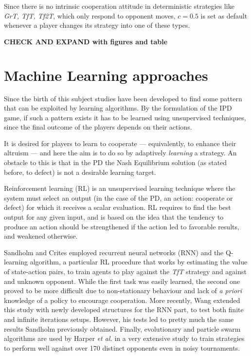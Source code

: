 \documentclass[journal,a4paper,10pt,twoside]{IEEEtran} %
\begin{document}
Since there is no intrinsic cooperation attitude in deterministic strategies like \textit{GrT, TfT, Tf2T}, which only respond to opponent moves, $c=0.5$ is set as default whenever a player changes its strategy into one of these types.

\textbf{CHECK AND EXPAND with figures and table}

\section{Machine Learning approaches} \label{s:ml}
Since the birth of this subject studies have been developed to find some pattern that can be exploited by learning algorithms.
By the formulation of the IPD game, if such a pattern exists it has to be learned using unsupervised techniques, since the final outcome of the players depends on their actions.

It is desired for players to learn to cooperate --- equivalently, to enhance their altruism --- and here the aim is to do so by adaptively \textit{learning} a strategy. An obstacle to this is that in the PD the Nash Equilibrium solution (as stated before, to defect) is not a desirable learning target. \cite{coopSeqRL}

Reinforcement learning (RL) is an unsupervised learning technique where the system must select an output (in the case of the PD, an action: cooperate or defect) for which it receives a scalar evaluation. RL requires to find the best output for any given input, and is based on the idea that the tendency to produce an action should be strengthened if the action led to favorable results, and weakened otherwise. \cite{sandholmRL}

Sandholm and Crites \cite{sandholmRL} employed recurrent neural networks (RNN) and the Q-learning algorithm, a particular RL procedure that works by estimating the value of state-action pairs, to train agents to play against the \textit{TfT} strategy and against and unknown opponent. While the first task was easily learned, the second one proved to be more difficult due to non-stationary behaviour and lack of \textit{a priori} knowledge of a policy to encourage cooperation.
More recently, Wang \cite{kedaoRL} extended this study with newly developed structures for the RNN part, to test both finite and infinite iterations setups. However, his tests led to pretty much the same results Sandholm previously obtained.
Finally, evolutionary and particle swarm algorithms are used by Harper \textit{et al.} in a very extensive study \cite{plosRLdominant} to train strategies to perform well against over 170 distinct opponents even in noisy tournaments.
\end{document}
